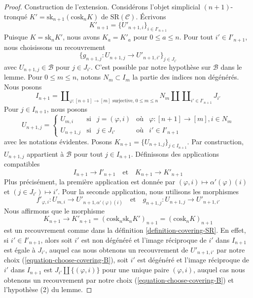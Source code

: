 \begin{proof}
\medskip\noindent
Construction de l'extension. Considérons l'objet simplicial $(n + 1)$-tronqué
$K' = \text{sk}_{n + 1}(\text{cosk}_n K)$ de $\text{SR}(\mathcal{C})$.
Écrivons
$$
K'_{n + 1} = \{U'_{n + 1, i}\}_{i \in I'_{n + 1}}
$$
Puisque $K = \text{sk}_n K'$, nous avons $K_a = K'_a$ pour $0 \leq a \leq n$.
Pour tout $i' \in I'_{n + 1}$, nous choisissons un recouvrement
\begin{equation}
\label{equation-choose-covering-B}
\{g_{n + 1, j} : U_{n + 1, j} \to U'_{n + 1, i'}\}_{j \in J_{i'}}
\end{equation}
avec $U_{n + 1, j} \in \mathcal{B}$ pour $j \in J_{i'}$.
C'est possible par notre hypothèse sur $\mathcal{B}$ dans le lemme.
Pour $0 \leq m \leq n$, notons $N_m \subset I_m$ la partie des
indices non dégénérés. Nous posons
$$
I_{n + 1} =
\coprod\nolimits_{\varphi : [n + 1] \to [m]\text{ surjective, }0\leq m \leq n}
N_m \amalg
\coprod\nolimits_{i' \in I'_{n + 1}} J_{i'}
$$
Pour $j \in I_{n + 1}$, nous posons
$$
U_{n + 1, j} =
\left\{
\begin{matrix}
U_{m, i} & \text{si} &
j = (\varphi, i) & \text{où} & \varphi : [n + 1] \to [m], i \in N_m \\
U_{n + 1, j} & \text{si} &
j \in J_{i'} & \text{où} & i' \in I'_{n + 1}
\end{matrix}
\right.
$$
avec les notations évidentes. Posons $K_{n + 1} = \{U_{n + 1, j}\}_{j \in I_{n + 1}}$.
Par construction, $U_{n + 1, j}$ appartient
à $\mathcal{B}$ pour tout $j \in I_{n + 1}$. Définissons des applications
compatibles
$$
I_{n + 1} \to I'_{n + 1}
\quad\text{et}\quad
K_{n + 1} \to K'_{n + 1}
$$
Plus précisément, la première application est donnée par
$(\varphi, i) \mapsto \alpha'(\varphi)(i)$ et
$(j \in J_{i'}) \mapsto i'$.
Pour la seconde application, nous utilisons les morphismes
$$
f'_{\varphi, i} : U_{m, i} \to U'_{n + 1, \alpha'(\varphi)(i)}
\quad\text{et}\quad
g_{n + 1, j} : U_{n + 1, j} \to U'_{n + 1, i'}
$$
Nous affirmons que le morphisme
$$
K_{n + 1} \to K'_{n + 1} =
(\text{cosk}_n \text{sk}_n K')_{n + 1} =
(\text{cosk}_n K)_{n + 1}
$$
est un recouvrement comme dans la définition \ref{definition-covering-SR}.
En effet, si $i' \in I'_{n + 1}$, alors soit $i'$ est non dégénéré
et l'image réciproque de $i'$ dans $I_{n + 1}$ est égale à $J_{i'}$,
auquel cas nous obtenons un recouvrement de $U'_{n + 1, i'}$ par notre choix
(\ref{equation-choose-covering-B}), soit $i'$ est dégénéré et
l'image réciproque de $i'$ dans $I_{n + 1}$ est
$J_{i'} \amalg \{(\varphi, i)\}$ pour une unique paire $(\varphi, i)$,
auquel cas nous obtenons un recouvrement par notre choix (\ref{equation-choose-covering-B})
et l'hypothèse (2) du lemme.


\end{proof}
